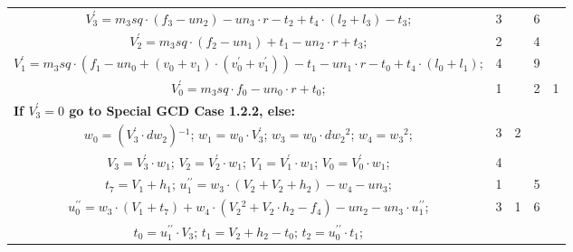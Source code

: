 \begin{tabular}{|c|cr|c|c|c|c|}
\multicolumn{3}{|R{340pt}|}{ 
$V^{\prime}_3=m_3sq \cdot (f_3-un_2)-un_3 \cdot r-t_2+t_4 \cdot (l_2+l_3)-t_3$;\hspace{4pt}
} & 3 &  & 6 & \\
\multicolumn{3}{|R{340pt}|}{ 
$V^{\prime}_2=m_3sq \cdot (f_2-un_1)+t_1-un_2 \cdot r+t_3$;\hspace{4pt}
} & 2 &  & 4 & \\
\multicolumn{3}{|R{340pt}|}{ 
$V^{\prime}_1=m_3sq \cdot (f_1-un_0+(v_0+v_1) \cdot (v^{\prime}_0+v^{\prime}_1))-t_1-un_1 \cdot r-t_0+t_4 \cdot (l_0+l_1)$;\hspace{4pt}
} & 4 &  & 9 & \\
\multicolumn{3}{|R{340pt}|}{ 
$V^{\prime}_0=m_3sq \cdot f_0-un_0 \cdot r+t_0$;\hspace{4pt}
} & 1 &  & 2 & 1\\
\multicolumn{3}{|l|}{ 
 \bf{If $V^{\prime}_3 = 0$ go to Special GCD Case 1.2.2, else:} } &  &  &  & \\
\multicolumn{3}{|R{340pt}|}{ 
$w_0=(V^{\prime}_3 \cdot dw_2){}^{-1}$;\hspace{4pt}
$w_1=w_0 \cdot V^{\prime}_3$;\hspace{4pt}
$w_3=w_0 \cdot dw_2{}^{2}$;\hspace{4pt}
$w_4=w_3{}^{2}$;\hspace{4pt}
} & 3 & 2 &  & \\
\multicolumn{3}{|R{340pt}|}{ 
$V_3=V^{\prime}_3 \cdot w_1$;\hspace{4pt}
$V_2=V^{\prime}_2 \cdot w_1$;\hspace{4pt}
$V_1=V^{\prime}_1 \cdot w_1$;\hspace{4pt}
$V_0=V^{\prime}_0 \cdot w_1$;\hspace{4pt}
} & 4 &  &  & \\
\multicolumn{3}{|R{340pt}|}{ 
$t_7=V_1+h_1$;\hspace{4pt}
$u^{\prime\prime}_1=w_3 \cdot (V_2+V_2+h_2)-w_4-un_3$;\hspace{4pt}
} & 1 &  & 5 & \\
\multicolumn{3}{|R{340pt}|}{ 
$u^{\prime\prime}_0=w_3 \cdot (V_1+t_7)+w_4 \cdot (V_2{}^{2}+V_2 \cdot h_2-f_4)-un_2-un_3 \cdot u^{\prime\prime}_1$;\hspace{4pt}
} & 3 & 1 & 6 & \\
\multicolumn{3}{|R{340pt}|}{ 
$t_0=u^{\prime\prime}_1 \cdot V_3$;\hspace{4pt}
$t_1=V_2+h_2-t_0$;\hspace{4pt}
$t_2=u^{\prime\prime}_0 \cdot t_1$;\hspace{4pt}
}
\end{tabular}
